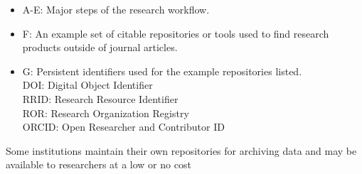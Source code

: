 \documentclass[10pt,letterpaper]{article}
\begin{document}
\begin{itemize}

\item A-E: Major steps of the research workflow.

\item F: An example set of citable repositories or tools used to find research products 
outside of journal articles.

\item G: Persistent identifiers used for the example repositories listed.\\
DOI: Digital Object Identifier\\
RRID: Research Resource Identifier\\
ROR: Research Organization Registry\\
ORCID: Open Researcher and Contributor ID

\end{itemize}

\noindent
Some institutions maintain their own repositories for archiving data
and may be available to researchers at a low or no cost
\end{document}
